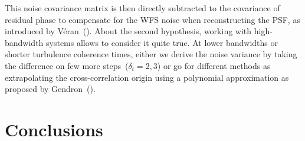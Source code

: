 \documentclass[12pt]{article}
\begin{document}
 This noise covariance matrix is then directly subtracted to the covariance of residual phase to compensate for the WFS noise when reconstructing the PSF, as introduced by V\'eran~(\cite{Veran1997}). About the second hypothesis, working with high-bandwidth systems allows to consider it quite true. At lower bandwidths or shorter turbulence coherence times, either we derive the noise variance by taking the difference on few more steps~($\delta_t =2,3$) or go for different methods as extrapolating the cross-correlation origin using a polynomial approximation as proposed by Gendron~(\cite{Gendron1995}).
\section{Conclusions}



 

\end{document}
